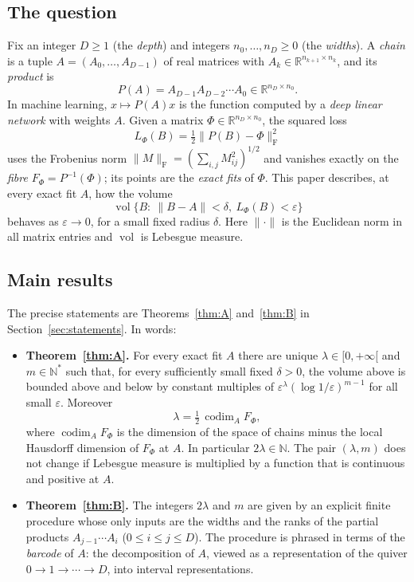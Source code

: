 \documentclass[11pt,a4paper]{article}
\theoremstyle{definition}
\theoremstyle{remark}
\numberwithin{equation}{section}
\newcommand{\N}{\mathbb{N}}
\newcommand{\R}{\mathbb{R}}
\newcommand{\codim}{\operatorname{codim}}
\newcommand{\vol}{\operatorname{vol}}
\newcommand{\Fr}[1]{\lVert #1\rVert_{\mathrm F}}
\newcommand{\norm}[1]{\lVert #1\rVert}
\newcommand{\eps}{\varepsilon}
\begin{document}
\subsection{The question}
Fix an integer $D\ge1$ (the \emph{depth}) and integers $n_0,\dots,n_D\ge0$ (the \emph{widths}). A \emph{chain} is a tuple $A=(A_0,\dots,A_{D-1})$ of real matrices with $A_k\in\R^{n_{k+1}\times n_k}$, and its \emph{product} is
\[
P(A)=A_{D-1}A_{D-2}\cdots A_0\in\R^{n_D\times n_0}.
\]
In machine learning, $x\mapsto P(A)x$ is the function computed by a \emph{deep linear network} with weights $A$. Given a matrix $\Phi\in\R^{n_D\times n_0}$, the squared loss
\[
L_\Phi(B)=\tfrac12\Fr{P(B)-\Phi}^2
\]
uses the Frobenius norm $\Fr M=(\sum_{i,j}M_{ij}^2)^{1/2}$ and vanishes exactly on the \emph{fibre} $F_\Phi=P^{-1}(\Phi)$; its points are the \emph{exact fits} of $\Phi$. This paper describes, at every exact fit $A$, how the volume
\[
\vol\{B:\ \norm{B-A}<\delta,\ L_\Phi(B)<\eps\}
\]
behaves as $\eps\to0$, for a small fixed radius $\delta$. Here $\norm\cdot$ is the Euclidean norm in all matrix entries and $\vol$ is Lebesgue measure.

\subsection{Main results}
The precise statements are Theorems~\ref{thm:A} and~\ref{thm:B} in Section~\ref{sec:statements}. In words:

\begin{itemize}
\item \textbf{Theorem~\ref{thm:A}.} For every exact fit $A$ there are unique $\lambda\in[0,+\infty[$ and $m\in\N^*$ such that, for every sufficiently small fixed $\delta>0$, the volume above is bounded above and below by constant multiples of $\eps^{\lambda}(\log1/\eps)^{m-1}$ for all small $\eps$. Moreover
\[
\lambda=\tfrac12\,\codim_AF_\Phi,
\]
where $\codim_AF_\Phi$ is the dimension of the space of chains minus the local Hausdorff dimension of $F_\Phi$ at $A$. In particular $2\lambda\in\N$. The pair $(\lambda,m)$ does not change if Lebesgue measure is multiplied by a function that is continuous and positive at $A$.
\item \textbf{Theorem~\ref{thm:B}.} The integers $2\lambda$ and $m$ are given by an explicit finite procedure whose only inputs are the widths and the ranks of the partial products $A_{j-1}\cdots A_i$ ($0\le i\le j\le D$). The procedure is phrased in terms of the \emph{barcode} of $A$: the decomposition of $A$, viewed as a representation of the quiver $0\to1\to\cdots\to D$, into interval representations.
\end{itemize}
\end{document}
